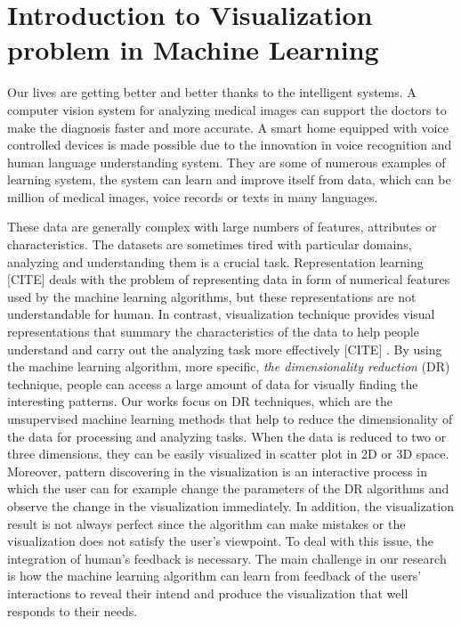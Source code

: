 \section{Introduction to Visualization problem in Machine Learning}

Our lives are getting better and better thanks to the intelligent systems.
A computer vision system for analyzing medical images can support the doctors to make the diagnosis faster and more accurate.
A smart home equipped with voice controlled devices is made possible due to the innovation in voice recognition and human language understanding system.
They are some of numerous examples of learning system, the system can learn and improve itself from data, which can be million of medical images, voice records or texts in many languages.

These data are generally complex with large numbers of features, attributes or characteristics.
The datasets are sometimes tired with particular domains, analyzing and understanding them is a crucial task.
Representation learning [CITE] deals with the problem of representing data in form of numerical features used by the machine learning algorithms, but these representations are not understandable for human.
In contrast, visualization technique provides visual representations that summary the characteristics of the data to help people understand and carry out the analyzing task more effectively [CITE] .
By using the machine learning algorithm, more specific, \emph{the dimensionality reduction} (DR) technique, people can access a large amount of data for visually finding the interesting patterns.
Our works focus on DR techniques, which are the unsupervised machine learning methods that help to reduce the dimensionality of the data for processing and analyzing tasks.
When the data is reduced to two or three dimensions, they can be easily visualized in scatter plot in 2D or 3D space.
Moreover, pattern discovering in the visualization is an interactive process in which the user can for example change the parameters of the DR algorithms and observe the change in the visualization immediately.
In addition, the visualization result is not always perfect since the algorithm can make mistakes or the visualization does not satisfy the user's viewpoint. To deal with this issue, the integration of human's feedback is necessary.
The main challenge in our research is how the machine learning algorithm can learn from feedback of the users' interactions to reveal their intend and produce the visualization that well responds to their needs.

